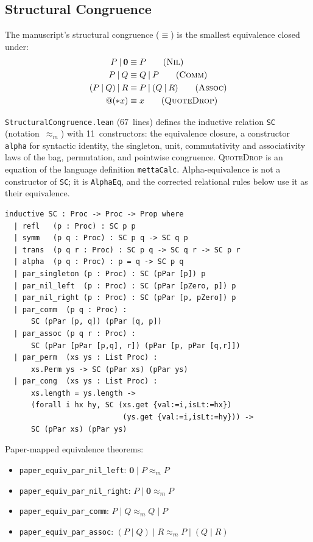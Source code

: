 \documentclass[11pt]{article}
\theoremstyle{definition}
\theoremstyle{remark}
\begin{document}
\subsection{Structural Congruence}

The manuscript's structural congruence ($\equiv$) is the smallest
equivalence closed under:
\begin{align}
  P \mathbin{|} \mathbf{0}  &\equiv P
    \tag{\textsc{Nil}} \\
  P \mathbin{|} Q            &\equiv Q \mathbin{|} P
    \tag{\textsc{Comm}} \\
  (P \mathbin{|} Q) \mathbin{|} R
                              &\equiv P \mathbin{|} (Q \mathbin{|} R)
    \tag{\textsc{Assoc}} \\
  @({*}x)                    &\equiv x
    \tag{\textsc{QuoteDrop}}
\end{align}

\texttt{StructuralCongruence.lean} (67~lines) defines the inductive
relation \texttt{SC} (notation~$\approx_m$) with 11~constructors: the
equivalence closure, a constructor \texttt{alpha} for syntactic identity,
the singleton, unit, commutativity and associativity laws of the bag,
permutation, and pointwise congruence.  \textsc{QuoteDrop} is an equation
of the language definition \texttt{mettaCalc}.  Alpha-equivalence is not a
constructor of \texttt{SC}; it is \texttt{AlphaEq}, and the corrected
relational rules below use it as their equivalence.

\begin{lstlisting}[caption={Structural congruence (from \texttt{StructuralCongruence.lean})}]
inductive SC : Proc -> Proc -> Prop where
  | refl   (p : Proc) : SC p p
  | symm   (p q : Proc) : SC p q -> SC q p
  | trans  (p q r : Proc) : SC p q -> SC q r -> SC p r
  | alpha  (p q : Proc) : p = q -> SC p q
  | par_singleton (p : Proc) : SC (pPar [p]) p
  | par_nil_left  (p : Proc) : SC (pPar [pZero, p]) p
  | par_nil_right (p : Proc) : SC (pPar [p, pZero]) p
  | par_comm  (p q : Proc) :
      SC (pPar [p, q]) (pPar [q, p])
  | par_assoc (p q r : Proc) :
      SC (pPar [pPar [p,q], r]) (pPar [p, pPar [q,r]])
  | par_perm  (xs ys : List Proc) :
      xs.Perm ys -> SC (pPar xs) (pPar ys)
  | par_cong  (xs ys : List Proc) :
      xs.length = ys.length ->
      (forall i hx hy, SC (xs.get {val:=i,isLt:=hx})
                           (ys.get {val:=i,isLt:=hy})) ->
      SC (pPar xs) (pPar ys)
\end{lstlisting}

\noindent
Paper-mapped equivalence theorems:
\begin{itemize}
\item \texttt{paper\_equiv\_par\_nil\_left}: $\mathbf{0} \mathbin{|} P \approx_m P$
\item \texttt{paper\_equiv\_par\_nil\_right}: $P \mathbin{|} \mathbf{0} \approx_m P$
\item \texttt{paper\_equiv\_par\_comm}: $P \mathbin{|} Q \approx_m Q \mathbin{|} P$
\item \texttt{paper\_equiv\_par\_assoc}: $(P \mathbin{|} Q) \mathbin{|} R \approx_m P \mathbin{|} (Q \mathbin{|} R)$
\end{itemize}
\end{document}
